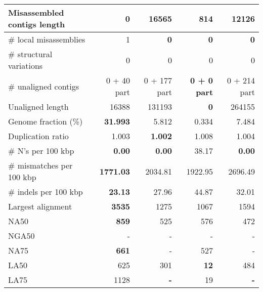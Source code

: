 \documentclass[12pt,a4paper]{article}
\begin{document}
\begin{table}[ht]
\begin{center}
\begin{tabular}{|l*{4}{|r}|}
Misassembled contigs length & {\bf 0} & 16565 & 814 & 12126 \\ \hline
\# local misassemblies & 1 & {\bf 0} & {\bf 0} & {\bf 0} \\ \hline
\# structural variations & 0 & 0 & 0 & 0 \\ \hline
\# unaligned contigs & 0 + 40 part & 0 + 177 part & {\bf 0 + 0 part} & 0 + 214 part \\ \hline
Unaligned length & 16388 & 131193 & {\bf 0} & 264155 \\ \hline
Genome fraction (\%) & {\bf 31.993} & 5.812 & 0.334 & 7.484 \\ \hline
Duplication ratio & 1.003 & {\bf 1.002} & 1.008 & 1.004 \\ \hline
\# N's per 100 kbp & {\bf 0.00} & {\bf 0.00} & 38.17 & {\bf 0.00} \\ \hline
\# mismatches per 100 kbp & {\bf 1771.03} & 2034.81 & 1922.95 & 2696.49 \\ \hline
\# indels per 100 kbp & {\bf 23.13} & 27.96 & 44.87 & 32.01 \\ \hline
Largest alignment & {\bf 3535} & 1275 & 1067 & 1594 \\ \hline
NA50 & {\bf 859} & 525 & 576 & 472 \\ \hline
NGA50 & - & - & - & - \\ \hline
NA75 & {\bf 661} & - & 527 & - \\ \hline
LA50 & 625 & 301 & {\bf 12} & 484 \\ \hline
LA75 & 1128 & {\bf -} & 19 & {\bf -} \\ \hline
\end{tabular}
\end{center}
\end{table}
\end{document}
